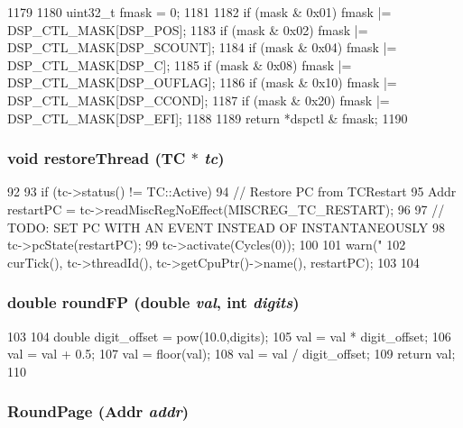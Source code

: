 \begin{DoxyCode}
1179 {
1180     uint32_t fmask = 0;
1181 
1182     if (mask & 0x01) fmask |= DSP_CTL_MASK[DSP_POS];
1183     if (mask & 0x02) fmask |= DSP_CTL_MASK[DSP_SCOUNT];
1184     if (mask & 0x04) fmask |= DSP_CTL_MASK[DSP_C];
1185     if (mask & 0x08) fmask |= DSP_CTL_MASK[DSP_OUFLAG];
1186     if (mask & 0x10) fmask |= DSP_CTL_MASK[DSP_CCOND];
1187     if (mask & 0x20) fmask |= DSP_CTL_MASK[DSP_EFI];
1188 
1189     return *dspctl & fmask;
1190 }
\end{DoxyCode}
\hypertarget{namespaceMipsISA_a0b64a2b72e9387f553f74f650a403bc9}{
\subsubsection[{restoreThread}]{\setlength{\rightskip}{0pt plus 5cm}void restoreThread (TC $\ast$ {\em tc})}}
\label{namespaceMipsISA_a0b64a2b72e9387f553f74f650a403bc9}



\begin{DoxyCode}
92 {
93     if (tc->status() != TC::Active) {
94         // Restore PC from TCRestart
95         Addr restartPC = tc->readMiscRegNoEffect(MISCREG_TC_RESTART);
96 
97         // TODO: SET PC WITH AN EVENT INSTEAD OF INSTANTANEOUSLY
98         tc->pcState(restartPC);
99         tc->activate(Cycles(0));
100 
101         warn("%
102                 curTick(), tc->threadId(), tc->getCpuPtr()->name(), restartPC);
103     }
104 }
\end{DoxyCode}
\hypertarget{namespaceMipsISA_a4205d010266118ca5ba2e7f99f6161f8}{
\subsubsection[{roundFP}]{\setlength{\rightskip}{0pt plus 5cm}double roundFP (double {\em val}, \/  int {\em digits})}}
\label{namespaceMipsISA_a4205d010266118ca5ba2e7f99f6161f8}



\begin{DoxyCode}
103 {
104     double digit_offset = pow(10.0,digits);
105     val = val * digit_offset;
106     val = val + 0.5;
107     val = floor(val);
108     val = val / digit_offset;
109     return val;
110 }
\end{DoxyCode}
\hypertarget{namespaceMipsISA_a3cf1a9ff2ed57d6ae150519212096c13}{
\subsubsection[{RoundPage}]{ RoundPage ({\bf Addr} {\em addr})}}
\label{namespaceMipsISA_a3cf1a9ff2ed57d6ae150519212096c13}



